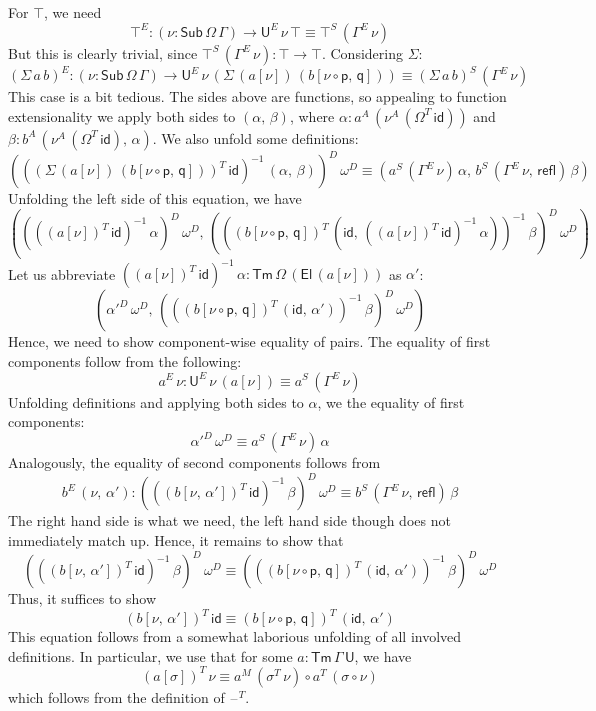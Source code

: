 \documentclass[12pt,a4paper,twoside,openany]{book}
\theoremstyle{remark}
\theoremstyle{definition}
\theoremstyle{theorem}
\newcommand{\refl}{\mathsf{refl}}
\newcommand{\id}{\mathsf{id}}
\newcommand{\Sub}{\mathsf{Sub}}
\newcommand{\Tm}{\mathsf{Tm}}
\newcommand{\U}{\mathsf{U}}
\newcommand{\El}{\mathsf{El}}
\newcommand{\blank}{\mathord{\hspace{1pt}\text{--}\hspace{1pt}}}
\newcommand{\p}{\mathsf{p}}
\newcommand{\q}{\mathsf{q}}
\begin{document}
For $\top$, we need
\[
  \top^E : (\nu : \Sub\,\Omega\,\Gamma) \to \U^E\,\nu\,\top \equiv \top^S\,(\Gamma^E\,\nu)
\]
But this is clearly trivial, since $\top^S\,(\Gamma^E\,\nu) : \top \to \top$. Considering $\Sigma$:
\[
(\Sigma\,a\,b)^E : (\nu : \Sub\,\Omega\,\Gamma) \to
  \U^E\,\nu\,(\Sigma\,(a[\nu])\,(b[\nu\circ\p,\,\q])) \equiv (\Sigma\,a\,b)^S\,(\Gamma^E\,\nu)
\]
This case is a bit tedious. The sides above are functions, so appealing to function extensionality
we apply both sides to $(\alpha,\,\beta)$, where $\alpha : a^A\,(\nu^A\,(\Omega^T\,\id))$ and
$\beta : b^A\,(\nu^A\,(\Omega^T\,\id),\,\alpha)$. We also unfold some definitions:
\[
(((\Sigma\,(a[\nu])\,(b[\nu\circ\p,\,\q]))^T\,\id)^{-1}\,(\alpha,\,\beta))^D\,\omega^D \equiv
(a^S\,(\Gamma^E\,\nu)\,\alpha,\,b^S\,(\Gamma^E\,\nu,\,\refl)\,\beta)
\]
Unfolding the left side of this equation, we have
\[
  ((((a[\nu])^T\,\id)^{-1}\,\alpha)^D\,\omega^D,\,(((b[\nu\circ\p,\,\q])^T\,(\id,\,((a[\nu])^T\,\id)^{-1}\,\alpha))^{-1}\,\beta)^D\,\omega^D)
\]
Let us abbreviate $((a[\nu])^T\,\id)^{-1}\,\alpha : \Tm\,\Omega\,(\El\,(a[\nu]))$ as $\alpha'$:
\[
  (\alpha'^D\,\omega^D,\,(((b[\nu\circ\p,\,\q])^T\,(\id,\,\alpha'))^{-1}\,\beta)^D\,\omega^D)
\]
Hence, we need to show component-wise equality of pairs. The equality of first components follow
from the following:
\[
  a^E\,\nu : \U^E\,\nu\,(a[\nu]) \equiv a^S\,(\Gamma^E\,\nu)
\]
Unfolding definitions and applying both sides to $\alpha$, we the equality of first components:
\[
  \alpha'^D\,\omega^D \equiv a^S\,(\Gamma^E\,\nu)\,\alpha
\]
Analogously, the equality of second components follows from
\[
b^E\,(\nu,\,\alpha') :
 (((b[\nu,\,\alpha'])^T\,\id)^{-1}\,\beta)^D\,\omega^D \equiv b^S\,(\Gamma^E\,\nu,\,\refl)\,\beta
\]
The right hand side is what we need, the left hand side though does not immediately match up.
Hence, it remains to show that
\[
(((b[\nu,\,\alpha'])^T\,\id)^{-1}\,\beta)^D\,\omega^D
\equiv
(((b[\nu\circ\p,\,\q])^T\,(\id,\,\alpha'))^{-1}\,\beta)^D\,\omega^D
\]
Thus, it suffices to show
\[
(b[\nu,\,\alpha'])^T\,\id \equiv (b[\nu\circ\p,\,\q])^T\,(\id,\,\alpha')
\]
This equation follows from a somewhat laborious unfolding of all involved definitions.
In particular, we use that for some $a : \Tm\,\Gamma\,\U$, we have
\[
  (a[\sigma])^T\,\nu \equiv a^M\,(\sigma^T\,\nu) \circ a^T\,(\sigma \circ \nu)
\]
which follows from the definition of $\blank^T$.
\end{document}
